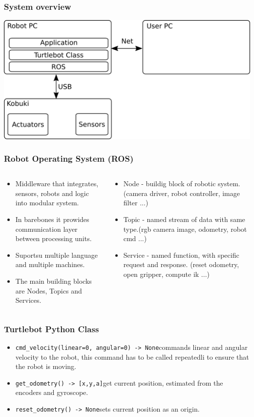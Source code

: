 \documentclass{beamer}
\begin{document}
\begin{frame}
  \frametitle{System overview}
  \includegraphics[width=\textwidth]{fig/system}
\end{frame}

\begin{frame}
  \frametitle{Robot Operating System (ROS)}
  \begin{columns}
    \begin{column}{0.5\textwidth}
      \begin{itemize}
      \item Middleware that integrates, sensors, robots and logic into modular system.
      \item In barebones it prowides communication layer between processing units.
      \item Suportsu multiple language and multiple machines.
      \item The main building blocks are Nodes, Topics and Services.
      \end{itemize}
    \end{column}
    \begin{column}{0.5\textwidth}
      \begin{itemize}
      \item Node - buildig block of robotic system. (camera driver, robot controller, image filter ...)
      \item Topic - named stream of data with same type.(rgb camera image, odometry, robot cmd ...)
      \item Service - named function, with specific request and response. (reset odometry, open gripper, compute ik ...)
      \end{itemize}
    \end{column}
  \end{columns}
\end{frame}


\begin{frame}[fragile]
  \frametitle{Turtlebot Python Class}
  \begin{itemize}
  \item
    \verb|cmd_velocity(linear=0, angular=0) -> None|\break commands linear and angular velocity to the robot, this command has to be called repeatedli to ensure that the robot is moving.
  \item
    \verb|get_odometry() -> [x,y,a]|\break get current position, estimated from the encoders and gyroscope.
  \item
    \verb|reset_odometry() -> None|\break sets current position as an origin.
  \end{itemize}
\end{frame}
\end{document}
